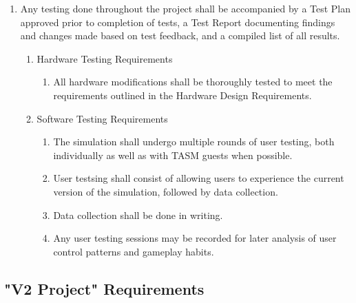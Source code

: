 \documentclass[12pt]{article} %
\begin{document}
\begin{enumerate}[label=\arabic*, leftmargin=*]
	\item Any testing done throughout the project shall be accompanied by a Test Plan approved prior to completion of tests, a Test Report documenting findings and changes made based on test feedback, and a compiled list of all results. 
	\begin{enumerate}[label=\arabic{enumi}.\arabic*, leftmargin=*]
		\item Hardware Testing Requirements
		\begin{enumerate}[label=\arabic{enumi}.\arabic{enumii}.\arabic*, leftmargin=*]
			\item All hardware modifications shall be thoroughly tested to meet the requirements outlined in the Hardware Design Requirements. 
		\end{enumerate}
		\item Software Testing Requirements
		\begin{enumerate}[label=\arabic{enumi}.\arabic{enumii}.\arabic*, leftmargin=*]
			\item The simulation shall undergo multiple rounds of user testing, both individually as well as with TASM guests when possible.
			\item User testsing shall consist of allowing users to experience the current version of the simulation, followed by data collection.
			\item Data collection shall be done in writing.
			\item Any user testing sessions may be recorded for later analysis of user control patterns and gameplay habits. 
		\end{enumerate}
	\end{enumerate}
\end{enumerate}

\subsection{"V2 Project" Requirements}
\end{document}
